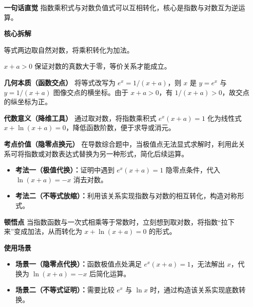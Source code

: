 \begin{explanationbox}
	\textbf{\textcolor{CExplanation}{一句话直觉}}
	指数乘积式与对数负值式可以互相转化，核心是指数与对数互为逆运算。

	\medskip
	\textbf{\textcolor{CExplanation}{核心拆解}}
	\begin{description}[style=nextline,leftmargin=2.8em,labelsep=0.5em,itemsep=0.45em]
		\item[\textbf{要点一（等价变形）：}]
			等式两边取自然对数，将乘积转化为加法。
		\item[\textbf{要点二（条件约束）：}]
			$x+a>0$ 保证对数的真数大于零，等价关系才能成立。
	\end{description}

	\medskip
	\textbf{\textcolor{CExplanation}{几何本质（函数交点）}}
	将等式改写为 $e^{x}=1/(x+a)$，则 $x$ 是 $y=e^{x}$ 与 $y=1/(x+a)$ 图像交点的横坐标。由于 $x+a>0$，有 $1/(x+a)>0$，故交点的纵坐标为正。

	\medskip
	\textbf{\textcolor{CExplanation}{代数意义（降维工具）}}
	通过取对数，将指数乘积式 $e^{x}(x+a)=1$ 化为线性式 $x+\ln(x+a)=0$，降低函数阶数，便于求导或消元。

	\medskip
	\textbf{\textcolor{CExplanation}{考点价值（隐零点换元）}}
	在导数综合题中，当极值点无法显式求解时，利用此关系可将指数或对数表达式替换为另一种形式，简化后续运算。
	\begin{itemize}[leftmargin=*,itemsep=0.5em,topsep=0.4em]
		\item \textbf{考法一（极值代换）：}证明中遇到 $e^{x}(x+a)=1$ 隐零点条件，代入 $\ln(x+a)=-x$ 消去对数。
		\item \textbf{考法二（不等式放缩）：}利用该关系实现指数与对数的相互转化，构造对称形式。
	\end{itemize}

	\medskip
	\textbf{\textcolor{CExplanation}{顿悟点}}
	当指数函数与一次式相乘等于常数时，立刻想到取对数，将指数“拉下来”变成加法，从而转化为 $x+\ln(x+a)=0$ 的形式。

	\medskip
	\textbf{\textcolor{CExplanation}{使用场景}}
	\begin{itemize}[leftmargin=*,itemsep=0.5em,topsep=0.4em]
		\item \textbf{场景一（隐零点代换）：}函数极值点处满足 $e^{x}(x+a)=1$，无法解出 $x$，代换为 $\ln(x+a)=-x$ 后简化运算。
		\item \textbf{场景二（不等式证明）：}需要比较 $e^{x}$ 与 $\ln x$ 时，通过构造该关系实现底数转换。
	\end{itemize}

\end{explanationbox}
